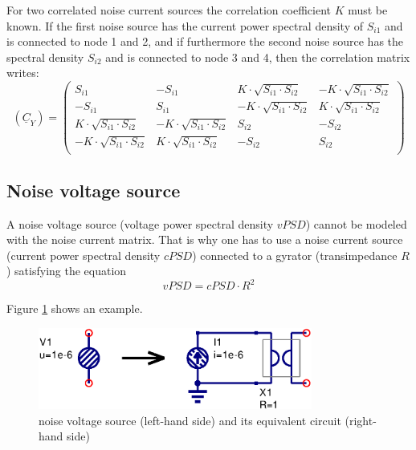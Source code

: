 For two correlated noise current sources the correlation coefficient $K$
must be known. If the first noise source has the current power spectral
density of $S_{i1}$ and is connected to node 1 and 2, and if furthermore
the second noise source has the spectral density $S_{i2}$ and is connected
to node 3 and 4, then the correlation matrix writes:
\begin{equation}
(\underline{C}_Y) =
\begin{pmatrix}
 S_{i1} & -S_{i1} &  K\cdot\sqrt{S_{i1}\cdot S_{i2}} & -K\cdot\sqrt{S_{i1}\cdot S_{i2}} \\
-S_{i1} &  S_{i1} & -K\cdot\sqrt{S_{i1}\cdot S_{i2}} &  K\cdot\sqrt{S_{i1}\cdot S_{i2}} \\
 K\cdot\sqrt{S_{i1}\cdot S_{i2}} & -K\cdot\sqrt{S_{i1}\cdot S_{i2}} &  S_{i2} & -S_{i2} \\
-K\cdot\sqrt{S_{i1}\cdot S_{i2}} &  K\cdot\sqrt{S_{i1}\cdot S_{i2}} & -S_{i2} &  S_{i2} \\
\end{pmatrix}
\end{equation}


\subsection{Noise voltage source}

A noise voltage source (voltage power spectral density $vPSD$) cannot
be modeled with the noise current matrix.  That is why one has to use
a noise current source (current power spectral density $cPSD$)
connected to a gyrator (transimpedance $R$) satisfying the equation
\begin{equation}
vPSD = cPSD \cdot R^2
\end{equation}

Figure \ref{fig:Unoise} shows an example.
\begin{figure}[ht]
\begin{center}
\includegraphics[width=9cm]{Unoise}
\end{center}
\caption{noise voltage source (left-hand side) and its equivalent circuit (right-hand side)}
\label{fig:Unoise}
\end{figure}
\FloatBarrier

